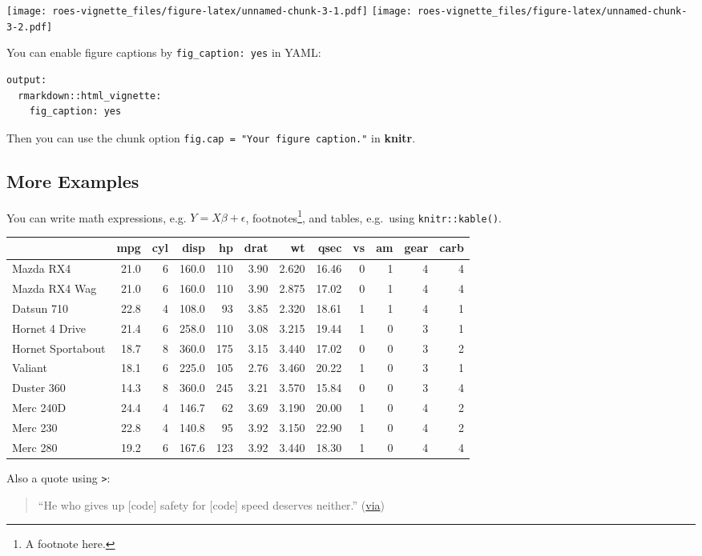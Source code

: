 \documentclass[]{article}
\let\rmarkdownfootnote\footnote%
\def\footnote{\protect\rmarkdownfootnote}
\begin{document}
\texttt{[image: roes-vignette\_files/figure-latex/unnamed-chunk-3-1.pdf]}
\texttt{[image: roes-vignette\_files/figure-latex/unnamed-chunk-3-2.pdf]}

You can enable figure captions by \texttt{fig\_caption:\ yes} in YAML:

\begin{verbatim}
output:
  rmarkdown::html_vignette:
    fig_caption: yes
\end{verbatim}

Then you can use the chunk option
\texttt{fig.cap\ =\ "Your\ figure\ caption."} in \textbf{knitr}.

\subsection{More Examples}\label{more-examples}

You can write math expressions, e.g. \(Y = X\beta + \epsilon\),
footnotes\footnote{A footnote here.}, and tables, e.g.~using
\texttt{knitr::kable()}.

\begin{longtable}[]{@{}lrrrrrrrrrrr@{}}
\toprule
& mpg & cyl & disp & hp & drat & wt & qsec & vs & am & gear &
carb\tabularnewline
\midrule
\endhead
Mazda RX4 & 21.0 & 6 & 160.0 & 110 & 3.90 & 2.620 & 16.46 & 0 & 1 & 4 &
4\tabularnewline
Mazda RX4 Wag & 21.0 & 6 & 160.0 & 110 & 3.90 & 2.875 & 17.02 & 0 & 1 &
4 & 4\tabularnewline
Datsun 710 & 22.8 & 4 & 108.0 & 93 & 3.85 & 2.320 & 18.61 & 1 & 1 & 4 &
1\tabularnewline
Hornet 4 Drive & 21.4 & 6 & 258.0 & 110 & 3.08 & 3.215 & 19.44 & 1 & 0 &
3 & 1\tabularnewline
Hornet Sportabout & 18.7 & 8 & 360.0 & 175 & 3.15 & 3.440 & 17.02 & 0 &
0 & 3 & 2\tabularnewline
Valiant & 18.1 & 6 & 225.0 & 105 & 2.76 & 3.460 & 20.22 & 1 & 0 & 3 &
1\tabularnewline
Duster 360 & 14.3 & 8 & 360.0 & 245 & 3.21 & 3.570 & 15.84 & 0 & 0 & 3 &
4\tabularnewline
Merc 240D & 24.4 & 4 & 146.7 & 62 & 3.69 & 3.190 & 20.00 & 1 & 0 & 4 &
2\tabularnewline
Merc 230 & 22.8 & 4 & 140.8 & 95 & 3.92 & 3.150 & 22.90 & 1 & 0 & 4 &
2\tabularnewline
Merc 280 & 19.2 & 6 & 167.6 & 123 & 3.92 & 3.440 & 18.30 & 1 & 0 & 4 &
4\tabularnewline
\bottomrule
\end{longtable}

Also a quote using \texttt{\textgreater{}}:

\begin{quote}
``He who gives up {[}code{]} safety for {[}code{]} speed deserves
neither.''
(\href{https://twitter.com/hadleywickham/status/504368538874703872}{via})
\end{quote}
\end{document}
